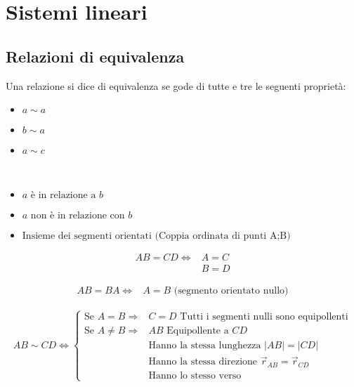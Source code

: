 \chapter{Sistemi lineari}
\section{Relazioni di equivalenza}

Una relazione si dice di equivalenza se gode di tutte e tre le seguenti proprietà:

\begin{itemize}
	\item{  $a\sim a$}
	\item{  $b\sim a$}
	\item{  $a\sim c$}
\end{itemize}

\begin{nota}
	\phantom{text}
	\leavevmode\\
	\begin{itemize}
		\item[]{ 		$a \text{ è in relazione a }b$}
		\item[]{ 	$a \text{ non è in relazione con }b$}
		\item[]{\makebox[2cm]{$\sum$\hfill} 		$\text{Insieme dei segmenti orientati (Coppia ordinata di punti A;B)}$}
	\end{itemize}
\end{nota}

\begin{align*}
	AB=CD\Leftrightarrow
	&A=C \\
	&B=D
\end{align*}

\begin{align*}
	AB=BA\Leftrightarrow
	&A=B \text{ (segmento orientato nullo)}
\end{align*}

\begin{align*}
	AB\sim CD\Leftrightarrow
	\begin{cases}
		\text{Se } A=B\Rightarrow & C=D \text{ Tutti i segmenti nulli sono equipollenti}\\
		\text{Se } A\neq B\Rightarrow & AB \text{ Equipollente a } CD\\
										& \text{Hanno la stessa lunghezza } |AB|=|CD|\\
										& \text {Hanno la stessa direzione } \overrightarrow{r}_{AB}=\overrightarrow{r}_{CD}\\
										&\text{Hanno lo stesso verso}
	\end{cases}
\end{align*}

